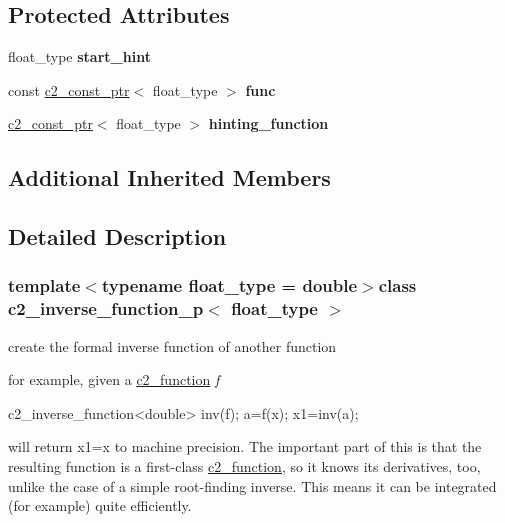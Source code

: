 \subsection*{Protected Attributes}
\begin{DoxyCompactItemize}
\item 
\hypertarget{classc2__inverse__function__p_a1d5e1f16d32ff5e8fef9e239ff5c18ed}{float\-\_\-type {\bfseries start\-\_\-hint}}\label{classc2__inverse__function__p_a1d5e1f16d32ff5e8fef9e239ff5c18ed}

\item 
\hypertarget{classc2__inverse__function__p_af8d083863a7965e901c684de7bd3cf8f}{const \hyperlink{classc2__const__ptr}{c2\-\_\-const\-\_\-ptr}$<$ float\-\_\-type $>$ {\bfseries func}}\label{classc2__inverse__function__p_af8d083863a7965e901c684de7bd3cf8f}

\item 
\hypertarget{classc2__inverse__function__p_a4e1f68a44dea194ec1737fdcc8a7f17f}{\hyperlink{classc2__const__ptr}{c2\-\_\-const\-\_\-ptr}$<$ float\-\_\-type $>$ {\bfseries hinting\-\_\-function}}\label{classc2__inverse__function__p_a4e1f68a44dea194ec1737fdcc8a7f17f}

\end{DoxyCompactItemize}
\subsection*{Additional Inherited Members}


\subsection{Detailed Description}
\subsubsection*{template$<$typename float\-\_\-type = double$>$class c2\-\_\-inverse\-\_\-function\-\_\-p$<$ float\-\_\-type $>$}

create the formal inverse function of another function

for example, given a \hyperlink{classc2__function}{c2\-\_\-function} {\itshape f} 


\begin{DoxyCode}
c2\_inverse\_function<double> inv(f);
a=f(x);
x1=inv(a);
\end{DoxyCode}
 will return x1=x to machine precision. The important part of this is that the resulting function is a first-\/class \hyperlink{classc2__function}{c2\-\_\-function}, so it knows its derivatives, too, unlike the case of a simple root-\/finding inverse. This means it can be integrated (for example) quite efficiently.

